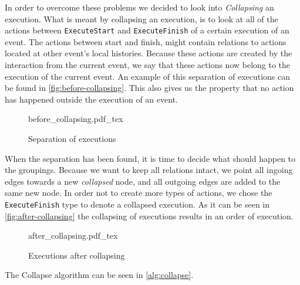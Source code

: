 	\newpar In order to overcome these problems we decided to look into \textit{Collapsing} an execution. What is meant by collapsing an execution, is to look at all of the actions between \texttt{ExecuteStart} and \texttt{ExecuteFinish} of a certain execution of an event. The actions between start and finish, might contain relations to actions located at other event's local histories. Because these actions are created by the interaction from the current event, we say that these actions now belong to the execution of the current event. An example of this separation of executions can be found in \autoref{fig:before-collapsing}. This also gives us the property that no action has happened outside the execution of an event.
	
	\begin{figure}
		\centering
		\def\svgwidth{0.42\columnwidth}
		\fontsize{6}{8}\selectfont
		{before_collapsing.pdf_tex}
		\caption{Separation of executions}
		\label{fig:before-collapsing}
	\end{figure}
	
	\newpar
	When the separation has been found, it is time to decide what should happen to the groupings. Because we want to keep all relations intact, we point all ingoing edges towards a new \textit{collapsed} node, and all outgoing edges are added to the same new node. In order not to create more types of actions, we chose the \texttt{ExecuteFinish} type to denote a collapsed execution. As it can be seen in \autoref{fig:after-collapsing} the collapsing of executions results in an order of execution.
	
	\begin{figure}
		\centering
		\def\svgwidth{0.22\columnwidth}
		\fontsize{6}{8}\selectfont
		{after_collapsing.pdf_tex}
		\caption{Executions after collapsing}
		\label{fig:after-collapsing}
	\end{figure}
	
	The Collapse algorithm can be seen in \autoref{alg:collapse}.
	
